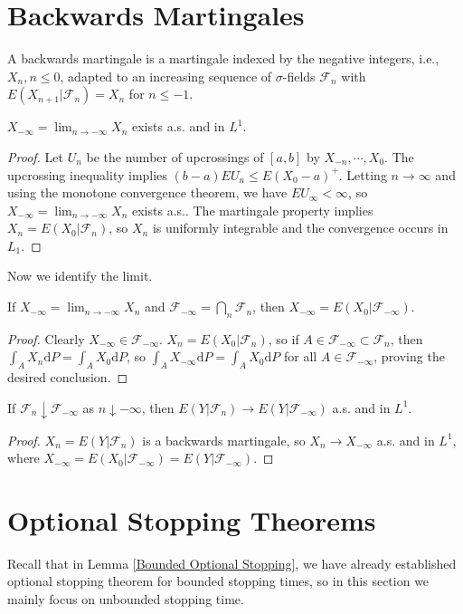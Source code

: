 \section{Backwards Martingales}
\begin{definition}
A backwards martingale is a martingale indexed by the negative integers, i.e., $X_n,n\le 0$, adapted to an increasing sequence of $\sigma$-fields $\mathcal{F}_n$ with $E(X_{n+1}|\mathcal{F}_n)=X_n$ for $n\le -1$.
\end{definition}
\begin{theorem}
$X_{-\infty}=\lim_{n\to-\infty}X_n$ exists a.s. and in $L^1$.
\end{theorem}
\begin{proof}
 Let $U_n$ be the number of upcrossings of $[a,b]$ by $X_{-n},\cdots,X_0$.
 The upcrossing inequality implies $(b-a)EU_n\le E(X_0-a)^+$. Letting $n\to\infty$ and using the monotone convergence theorem,
 we have $EU_\infty<\infty$, so $X_{-\infty}=\lim_{n\to-\infty}X_n$ exists a.s..\newline 
 The martingale property implies $X_n=E(X_0|\mathcal{F}_n)$, so $X_n$ is uniformly integrable and the convergence occurs in $L_1$.

\end{proof}
Now we identify the limit.
\begin{theorem}
If $X_{-\infty}=\lim_{n\to-\infty}X_n$ and $\mathcal{F}_{-\infty}=\bigcap_n\mathcal{F}_n$, then $X_{-\infty}=E(X_0|\mathcal{F}_{-\infty})$.
\end{theorem}
\begin{proof}
Clearly $X_{-\infty}\in\mathcal{F}_{-\infty}$. $X_n=E(X_0|\mathcal{F}_n)$, so if $A\in\mathcal{F}_{-\infty}\subset\mathcal{F}_n$, then $\int_AX_n\mathrm{d}P=\int_AX_0\mathrm{d}P$, so $\int_AX_{-\infty}\mathrm{d}P=\int_AX_0\mathrm{d}P$ for all $A\in\mathcal{F}_{-\infty}$, proving the desired conclusion.
\end{proof}
\begin{theorem}
If $\mathcal{F}_n\downarrow\mathcal{F}_{-\infty}$ as $n\downarrow -\infty$, then $E(Y|\mathcal{F}_n)\to E(Y|\mathcal{F}_{-\infty})$ a.s. and in $L^1$.
\end{theorem}
\begin{proof}
$X_n=E(Y|\mathcal{F}_n)$ is a backwards martingale, so $X_n\to X_{-\infty}$ a.s. and in $L^1$, where $X_{-\infty}=E(X_0|\mathcal{F}_{-\infty})=E(Y|\mathcal{F}_{-\infty})$.
\end{proof}

\section{Optional Stopping Theorems}
Recall that in Lemma \ref{Bounded Optional Stopping}, we have already established optional stopping theorem for bounded stopping times,
so in this section we mainly focus on unbounded stopping time. 


